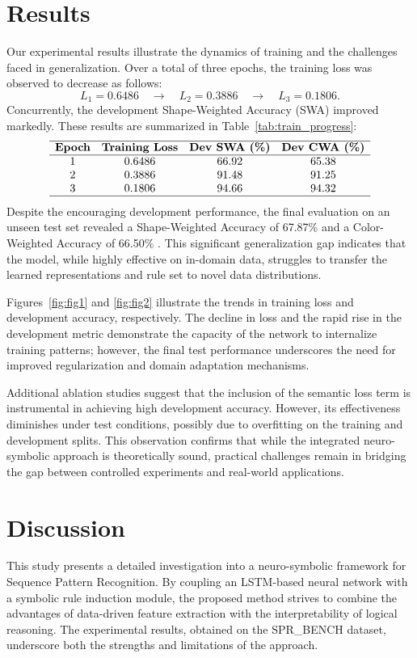 \documentclass{article}
\begin{document}
\section{Results}
Our experimental results illustrate the dynamics of training and the challenges faced in generalization. Over a total of three epochs, the training loss was observed to decrease as follows:
\[
L_1 = 0.6486 \quad \rightarrow \quad L_2 = 0.3886 \quad \rightarrow \quad L_3 = 0.1806.
\]
Concurrently, the development Shape-Weighted Accuracy (SWA) improved markedly.
These results are summarized in Table~\ref{tab:train_progress}:
\[
\begin{array}{cccc}
\hline
\textbf{Epoch} & \textbf{Training Loss} & \textbf{Dev SWA (\%)} & \textbf{Dev CWA (\%)} \\
\hline
1 & 0.6486 & 66.92 & 65.38 \\
2 & 0.3886 & 91.48 & 91.25 \\
3 & 0.1806 & 94.66 & 94.32 \\
\hline
\end{array}
\]
Despite the encouraging development performance, the final evaluation on an unseen test set revealed a Shape-Weighted Accuracy of 67.87\% and a Color-Weighted Accuracy of 66.50\% . This significant generalization gap indicates that the model, while highly effective on in-domain data, struggles to transfer the learned representations and rule set to novel data distributions.

Figures~\ref{fig:fig1} and \ref{fig:fig2} illustrate the trends in training loss and development accuracy, respectively. The decline in loss and the rapid rise in the development metric demonstrate the capacity of the network to internalize training patterns; however, the final test performance underscores the need for improved regularization and domain adaptation mechanisms.

Additional ablation studies suggest that the inclusion of the semantic loss term is instrumental in achieving high development accuracy. However, its effectiveness diminishes under test conditions, possibly due to overfitting on the training and development splits. This observation confirms that while the integrated neuro-symbolic approach is theoretically sound, practical challenges remain in bridging the gap between controlled experiments and real-world applications.

\section{Discussion}
This study presents a detailed investigation into a neuro-symbolic framework for Sequence Pattern Recognition. By coupling an LSTM-based neural network with a symbolic rule induction module, the proposed method strives to combine the advantages of data-driven feature extraction with the interpretability of logical reasoning. The experimental results, obtained on the SPR\_BENCH dataset, underscore both the strengths and limitations of the approach.
\end{document}
